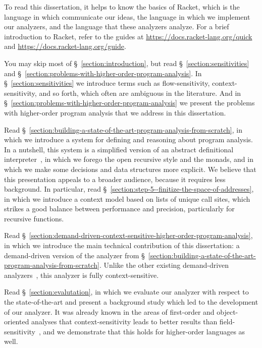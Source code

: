 \documentclass[12pt, oneside]{book}
\begin{document}
To read this dissertation, it helps to know the basics of Racket, which is the language in which communicate our ideas, the language in which we implement our analyzers, and the language that these analyzers analyze. For a brief introduction to Racket, refer to the guides at \url{https://docs.racket-lang.org/quick} and \url{https://docs.racket-lang.org/guide}.

You may skip most of §~\ref{section:introduction}, but read §~\ref{section:sensitivities} and §~\ref{section:problems-with-higher-order-program-analysis}. In §~\ref{section:sensitivities} we introduce terms such as flow-sensitivity, context-sensitivity, and so forth, which often are ambiguous in the literature. And in §~\ref{section:problems-with-higher-order-program-analysis} we present the problems with higher-order program analysis that we address in this dissertation.

Read §~\ref{section:building-a-state-of-the-art-program-analysis-from-scratch}, in which we introduce a system for defining and reasoning about program analysis. In a nutshell, this system is a simplified version of an abstract definitional interpreter~\cite{adi}, in which we forego the open recursive style and the monads, and in which we make some decisions and data structures more explicit. We believe that this presentation appeals to a broader audience, because it requires less background. In particular, read §~\ref{section:step-5--finitize-the-space-of-addresses}, in which we introduce a context model based on lists of unique call sites, which strikes a good balance between performance and precision, particularly for recursive functions.

Read §~\ref{section:demand-driven-context-sensitive-higher-order-program-analysis}, in which we introduce the main technical contribution of this dissertation: a demand-driven version of the analyzer from §~\ref{section:building-a-state-of-the-art-program-analysis-from-scratch}. Unlike the other existing demand-driven analyzers~\cite{ecoop-16, toplas,  demand-0cfa}, this analyzer is fully context-sensitive.

Read §~\ref{section:evalutation}, in which we evaluate our analyzer with respect to the state-of-the-art and present a background study which led to the development of our analyzer. It was already known in the areas of first-order and object-oriented analyses that context-sensitivity leads to better results than field-sensitivity~\cite{lcl}, and we demonstrate that this holds for higher-order languages as well.
\end{document}
